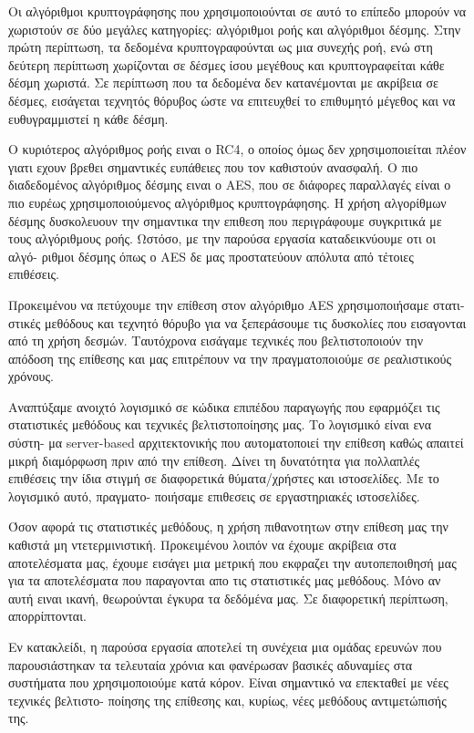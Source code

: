 Οι αλγόριθμοι κρυπτογράφησης που χρησιμοποιούνται σε αυτό το επίπεδο μπορούν να
χωριστούν σε δύο μεγάλες κατηγορίες: αλγόριθμοι ροής και αλγόριθμοι δέσμης.
Στην πρώτη περίπτωση, τα δεδομένα κρυπτογραφούνται ως μια συνεχής ροή,  ενώ στη 
δεύτερη περίπτωση χωρίζονται σε δέσμες ίσου μεγέθους και κρυπτογραφείται κάθε δέσμη χωριστά. 
Σε περίπτωση που τα δεδομένα δεν κατανέμονται με ακρίβεια σε δέσμες, εισάγεται τεχνητός
θόρυβος ώστε να επιτευχθεί το επιθυμητό μέγεθος και να ευθυγραμμιστεί η κάθε δέσμη.

Ο κυριότερος αλγόριθμος ροής ειναι ο RC4\cite{rc4}, ο οποίος όμως δεν χρησιμοποιείται πλέον
γιατι εχουν βρεθει σημαντικές ευπάθειες που τον καθιστούν ανασφαλή. Ο πιο
διαδεδομένος αλγόριθμος δέσμης ειναι ο AES, που σε διάφορες παραλλαγές είναι ο
πιο ευρέως χρησιμοποιούμενος αλγόριθμος κρυπτογράφησης. Η χρήση αλγορίθμων δέσμης
δυσκολευουν την σημαντικα την επιθεση που περιγράφουμε συγκριτικά με τους αλγόριθμους ροής.
Ωστόσο, με την παρούσα εργασία καταδεικνύουμε οτι οι αλγό- ριθμοι δέσμης όπως ο AES δε
μας προστατεύουν απόλυτα από τέτοιες επιθέσεις. 

Προκειμένου να πετύχουμε την επίθεση στον αλγόριθμο AES χρησιμοποιήσαμε στατι- στικές
μεθόδους και τεχνητό θόρυβο για να ξεπεράσουμε τις δυσκολίες που εισαγονται από τη
χρήση δεσμών. Ταυτόχρονα εισάγαμε τεχνικές που βελτιστοποιούν την απόδοση της
επίθεσης και μας επιτρέπουν να την πραγματοποιούμε σε ρεαλιστικούς χρόνους.

Αναπτύξαμε ανοιχτό λογισμικό σε κώδικα επιπέδου παραγωγής που εφαρμόζει τις στατιστικές
μεθόδους και τεχνικές βελτιστοποίησης μας. Το λογισμικό είναι ενα σύστη- μα server-based
αρχιτεκτονικής που αυτοματοποιεί την επίθεση καθώς απαιτεί μικρή διαμόρφωση πριν από την
επίθεση. Δίνει τη δυνατότητα για πολλαπλές επιθέσεις την ίδια στιγμή σε διαφορετικά θύματα/χρήστες
και ιστοσελίδες. Με το λογισμικό αυτό, πραγματο- ποιήσαμε επιθεσεις σε εργαστηριακές ιστοσελίδες.

Όσον αφορά τις στατιστικές μεθόδους, η χρήση πιθανοτητων στην επίθεση μας την καθιστά μη
ντετερμινιστική. Προκειμένου λοιπόν να έχουμε ακρίβεια στα αποτελέσματα μας, έχουμε εισάγει
μια μετρική που εκφραζει την αυτοπεποιθησή μας για τα αποτελέσματα που παραγονται απο
τις στατιστικές μας μεθόδους. Μόνο αν αυτή ειναι ικανή, θεωρούνται έγκυρα τα δεδόμένα μας.
Σε διαφορετική περίπτωση, απορρίπτονται.


Εν κατακλείδι, η παρούσα εργασία αποτελεί τη συνέχεια μια ομάδας ερευνών που
παρουσιάστηκαν τα τελευταία χρόνια και φανέρωσαν βασικές αδυναμίες στα
συστήματα που χρησιμοποιούμε κατά κόρον. Είναι σημαντικό να επεκταθεί με νέες
τεχνικές βελτιστο- ποίησης της επίθεσης και, κυρίως, νέες μεθόδους αντιμετώπισής
της.

